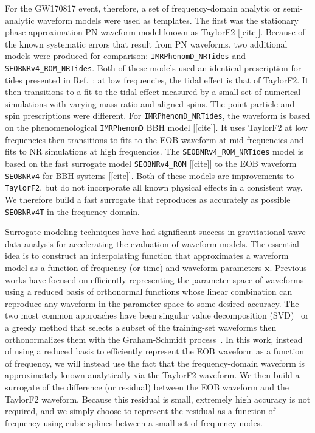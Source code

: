 \documentclass[prd,aps,letter,twocolumn,floatfix,notitlepage,nofootinbib]{revtex4-1}
\def\bx{\mathbf{x}}
\begin{document}
For the GW170817 event, therefore, a set of frequency-domain analytic or semi-analytic waveform models were used as templates. The first was the stationary phase approximation PN waveform model known as TaylorF2 [[cite]]. Because of the known systematic errors that result from PN waveforms, two additional models were produced for comparison: \texttt{IMRPhenomD\_NRTides} and \texttt{SEOBNRv4\_ROM\_NRTides}. Both of these models used an identical prescription for tides presented in Ref.~\cite{DietrichBernuzziTichy2017}; at low frequencies, the tidal effect is that of TaylorF2. It then transitions to a fit to the tidal effect measured by a small set of numerical simulations with varying mass ratio and aligned-spins. The point-particle and spin prescriptions were different. For \texttt{IMRPhenomD\_NRTides}, the waveform is based on the phenomenological \texttt{IMRPhenomD} BBH model [[cite]]. It uses TaylorF2 at low frequencies then transitions to fits to the EOB waveform at mid frequencies and fits to NR simulations at high frequencies. The \texttt{SEOBNRv4\_ROM\_NRTides} model is based on the fast surrogate model \texttt{SEOBNRv4\_ROM} [[cite]] to the EOB waveform \texttt{SEOBNRv4} for BBH systems [[cite]]. Both of these models are improvements to \texttt{TaylorF2}, but do not incorporate all known physical effects in a consistent way. We therefore build a fast surrogate that reproduces as accurately as possible \texttt{SEOBNRv4T} in the frequency domain.

Surrogate modeling techniques have had significant success in gravitational-wave data analysis for accelerating the evaluation of waveform models. The essential idea is to construct an interpolating function that approximates a waveform model as a function of frequency (or time) and waveform parameters $\bx$. Previous works have focused on efficiently representing the parameter space of waveforms using a reduced basis of orthonormal functions whose linear combination can reproduce any waveform in the parameter space to some desired accuracy. The two most common approaches have been singular value decomposition (SVD)~\cite{Puerrer2014, Puerrer2015} or a greedy method that selects a subset of the training-set waveforms then orthonormalizes them with the Graham-Schmidt process~\cite{FieldGalleyHesthaven2014, LackeyBernuzziGalley2017, BlackmanFieldGalley2015, BlackmanFieldScheel2017a, BlackmanFieldScheel2017b}. In this work, instead of using a reduced basis to efficiently represent the EOB waveform as a function of frequency, we will instead use the fact that the frequency-domain waveform is approximately known analytically via the TaylorF2 waveform. We then build a surrogate of the difference (or residual) between the EOB waveform and the TaylorF2 waveform. Because this residual is small, extremely high accuracy is not required, and we simply choose to represent the residual as a function of frequency using cubic splines between a small set of frequency nodes.
\end{document}

